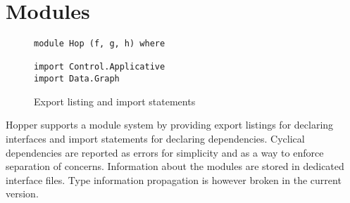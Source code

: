 \section{Modules}

\begin{figure}[!htb]
\centering
\begin{lstlisting} 
module Hop (f, g, h) where

import Control.Applicative
import Data.Graph
\end{lstlisting}
\caption{Export listing and import statements}
\label{lst:exportimport}
\end{figure}


Hopper supports a module system by providing export listings for declaring interfaces and import statements for declaring dependencies. Cyclical dependencies are reported as errors for simplicity and as a way to enforce separation of concerns.
Information about the modules are stored in dedicated interface files. Type information propagation is however broken in the current version.
